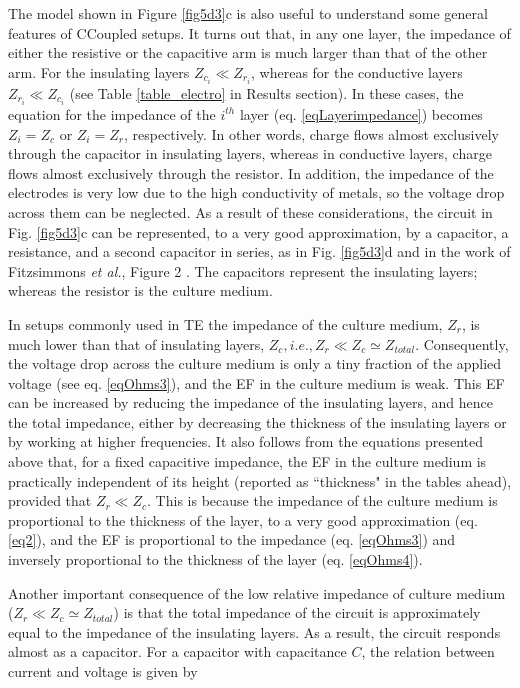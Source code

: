 The model shown in Figure \ref{fig5d3}c is also useful to understand some general features of \acs{CCoupled} setups. It turns out that, in any one layer, the impedance of either the resistive or the capacitive arm is much larger than that of the other arm. For the insulating layers $ Z_{c_i} \ll Z_{r_i} $, whereas for the conductive layers $ Z_{r_i} \ll Z_{c_i} $ (see Table \ref{table_electro} in Results section). In these cases, the equation for the impedance of the $i^{th}$ layer (eq. \ref{eqLayerimpedance}) becomes $Z_i = Z_c$ or $Z_i = Z_r$, respectively. In other words, charge flows almost exclusively through the capacitor in insulating layers, whereas in conductive layers, charge flows almost exclusively through the resistor. In addition, the impedance of the electrodes is very low due to the high conductivity of metals, so the voltage drop across them can be neglected. As a result of these considerations, the circuit in Fig. \ref{fig5d3}c can be represented, to a very good approximation, by a capacitor, a resistance, and a second capacitor in series, as in Fig. \ref{fig5d3}d and in the work of Fitzsimmons \textit{et al.}, Figure 2 \cite{Fitzsimmons1986-ks}. The capacitors represent the insulating layers; whereas the resistor is the culture medium.

In setups commonly used in \acs{TE} the impedance of the culture medium, $Z_r$, is much lower than that of insulating layers, $Z_c , i.e., Z_r \ll Z_c \simeq Z_{total}$. Consequently, the voltage drop across the culture medium is only a tiny fraction of the applied voltage (see eq. \ref{eqOhms3}), and the \acs{EF} in the culture medium is weak. This \acs{EF} can be increased by reducing the impedance of the insulating layers, and hence the total impedance, either by decreasing the thickness of the insulating layers or by working at higher frequencies. It also follows from the equations presented above that, for a fixed capacitive impedance, the \acs{EF} in the culture medium is practically independent of its height (reported as ``thickness" in the tables ahead), provided that $Z_r \ll Z_c$. This is because the impedance of the culture medium is proportional to the thickness of the layer, to a very good approximation (eq. \ref{eq2}), and the \acs{EF} is proportional to the impedance (eq. \ref{eqOhms3}) and inversely proportional to the thickness of the layer (eq. \ref{eqOhms4}).

Another important consequence of the low relative impedance of culture medium ($Z_r \ll Z_c \simeq Z_{total}$) is that the total impedance of the circuit is approximately equal to the impedance of the insulating layers. As a result, the circuit responds almost as a capacitor. For a capacitor with capacitance $C$, the relation between current and voltage is given by 

